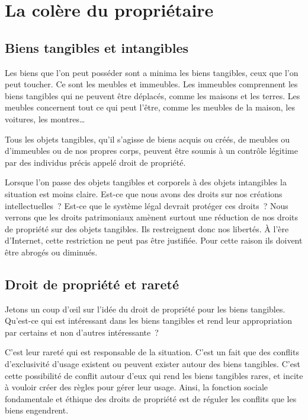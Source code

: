 \chapter{La colère du propriétaire}\label{proprio}

\section{Biens tangibles et intangibles}

Les biens que l'on peut posséder sont a minima les biens tangibles, ceux que l'on peut toucher. Ce sont les meubles et immeubles. Les immeubles comprennent les biens tangibles qui ne peuvent être déplacés, comme les maisons et les terres. Les meubles concernent tout ce qui peut l'être, comme les meubles de la maison, les voitures, les montres…

Tous les objets tangibles, qu'il s'agisse de biens acquis ou créés, de meubles ou d'immeubles ou de nos propres corps, peuvent être soumis à un contrôle légitime par des individus précis appelé droit de propriété.

Lorsque l'on passe des objets tangibles et corporels à des objets intangibles la situation est moins claire. Est-ce que nous avons des droits sur nos créations intellectuelles~? Est-ce que le système légal devrait protéger ces droits~? Nous verrons que les droits patrimoniaux amènent surtout une réduction de nos droits de propriété sur des objets tangibles. Ils restreignent donc nos libertés. À l'ère d'Internet, cette restriction ne peut pas être justifiée. Pour cette raison ils doivent être abrogés ou diminués. 

\section{Droit de propriété et rareté}

Jetons un coup d'œil sur l'idée du droit de propriété pour les biens tangibles. Qu'est-ce qui est intéressant dans les biens tangibles et rend leur appropriation par certains et non d'autres intéressante~? 

C'est leur rareté qui est responsable de la situation. C'est un fait que des conflits d'exclusivité d'usage existent ou peuvent exister autour des biens tangibles. C'est cette possibilité de conflit autour d'eux qui rend les biens tangibles rares, et incite à vouloir créer des règles pour gérer leur usage. Ainsi, la fonction sociale fondamentale et éthique des droits de propriété est de réguler les conflits que les biens engendrent. 

